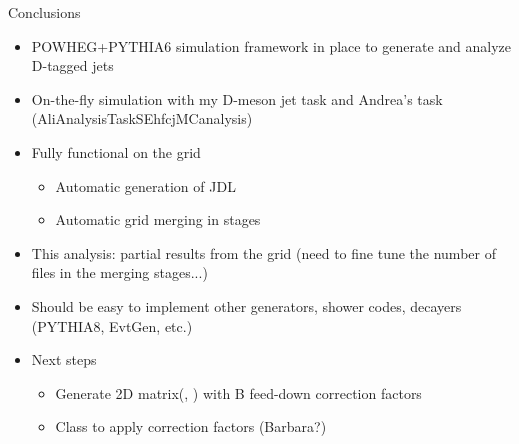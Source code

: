 \documentclass[xcolor={usenames,dvipsnames}]{beamer}
\begin{document}
\begin{frame}{Conclusions}
\begin{itemize}
\item POWHEG+PYTHIA6 simulation framework in place to generate and analyze D-tagged jets
\item On-the-fly simulation with my D-meson jet task and Andrea's task (AliAnalysisTaskSEhfcjMCanalysis)
\item Fully functional on the grid
\begin{itemize}
\item Automatic generation of JDL
\item Automatic grid merging in stages
\end{itemize}
\item This analysis: partial results from the grid (need to fine tune the number of files in the merging stages...)
\item Should be easy to implement other generators, shower codes, decayers (PYTHIA8, EvtGen, etc.)
\item Next steps 
\begin{itemize}
\item Generate 2D matrix(\ptchjet, \ptd) with B feed-down correction factors
\item Class to apply correction factors (Barbara?)
\end{itemize}
\end{itemize}
\end{frame}
\end{document}
